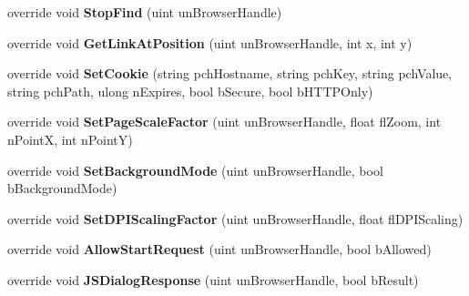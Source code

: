 \begin{DoxyCompactItemize}
override void {\bfseries Stop\+Find} (uint un\+Browser\+Handle)
\item 
\mbox{\label{class_valve_1_1_steamworks_1_1_c_steam_h_t_m_l_surface_a9a5f55601895879c9f309ab5b7aae33a}} 
override void {\bfseries Get\+Link\+At\+Position} (uint un\+Browser\+Handle, int x, int y)
\item 
\mbox{\label{class_valve_1_1_steamworks_1_1_c_steam_h_t_m_l_surface_a5c7db138efca9f8a912ebd963cd0efd7}} 
override void {\bfseries Set\+Cookie} (string pch\+Hostname, string pch\+Key, string pch\+Value, string pch\+Path, ulong n\+Expires, bool b\+Secure, bool b\+H\+T\+T\+P\+Only)
\item 
\mbox{\label{class_valve_1_1_steamworks_1_1_c_steam_h_t_m_l_surface_ad878f45d92dc51ce04fa3f447a4c0383}} 
override void {\bfseries Set\+Page\+Scale\+Factor} (uint un\+Browser\+Handle, float fl\+Zoom, int n\+PointX, int n\+PointY)
\item 
\mbox{\label{class_valve_1_1_steamworks_1_1_c_steam_h_t_m_l_surface_aaf2b58ad81ffd049b11b86ff2875245a}} 
override void {\bfseries Set\+Background\+Mode} (uint un\+Browser\+Handle, bool b\+Background\+Mode)
\item 
\mbox{\label{class_valve_1_1_steamworks_1_1_c_steam_h_t_m_l_surface_a4e930e526e820ceb7cfdfccaeb946214}} 
override void {\bfseries Set\+D\+P\+I\+Scaling\+Factor} (uint un\+Browser\+Handle, float fl\+D\+P\+I\+Scaling)
\item 
\mbox{\label{class_valve_1_1_steamworks_1_1_c_steam_h_t_m_l_surface_adf470822363986933e22e7ddab711fb3}} 
override void {\bfseries Allow\+Start\+Request} (uint un\+Browser\+Handle, bool b\+Allowed)
\item 
\mbox{\label{class_valve_1_1_steamworks_1_1_c_steam_h_t_m_l_surface_a11edcaf2291814abf8972434c5213b61}} 
override void {\bfseries J\+S\+Dialog\+Response} (uint un\+Browser\+Handle, bool b\+Result)
\end{DoxyCompactItemize}


